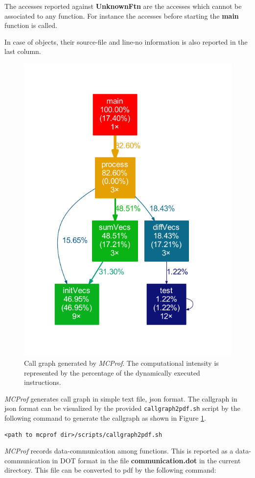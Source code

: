 \documentclass[10pt]{article}
\newcommand{\MCPROF}{\emph{MCProf}}
\begin{document}
The accesses reported against \textbf{UnknownFtn} are the accesses which cannot
be associated to any function. For instance the accesses before starting the
\textbf{main} function is called.

In case of objects, their source-file and line-no information is also reported in
the last column.

\begin{figure}[!h]
\centering
\includegraphics[width=0.75\linewidth]{figures/callgraph.pdf}
\caption{Call graph generated by \MCPROF{}. The computational intensity is
    represented by the percentage of the dynamically executed instructions.}
\label{fig:callgraph}
\end{figure}

\MCPROF{} generates call graph in simple text file, json format. The callgraph
in json format can be visualized by the provided \verb|callgraph2pdf.sh| script
by the following command to generate the callgraph as shown in
Figure \ref{fig:callgraph}.

{
\small
\begin{Verbatim}[frame=single]
<path to mcprof dir>/scripts/callgraph2pdf.sh
\end{Verbatim}
}

\MCPROF{} records data-communication among functions. This is reported as a
data-communication in DOT format in the file \textbf{communication.dot} in the
current directory. This file can be converted to pdf by the following command:
\end{document}

